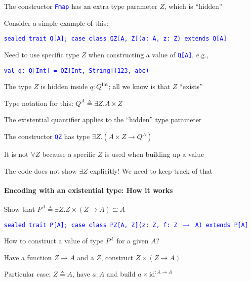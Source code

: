 The constructor \texttt{\textcolor{blue}{\footnotesize{}Fmap}} has
an extra type parameter $Z$, which is \textsf{``}hidden\textsf{''}

Consider a simple example of this:

\texttt{\textcolor{blue}{\footnotesize{}sealed trait Q{[}A{]}; case
class QZ{[}A, Z{]}(a: A, z: Z) extends Q{[}A{]}}}{\footnotesize\par}

Need to use specific type $Z$ when constructing a value of \texttt{\textcolor{blue}{\footnotesize{}Q{[}A{]}}},
e.g.,

\texttt{\textcolor{blue}{\footnotesize{}val q: Q{[}Int{]} = QZ{[}Int,
String{]}(123, \textquotedbl abc\textquotedbl )}}{\footnotesize\par}

The type $Z$ is hidden inside $q:Q^{\text{Int}}$; all we know is
that $Z$ \textsf{``}exists\textsf{''}

Type notation for this: $Q^{A}\triangleq\exists Z.A\times Z$

The existential quantifier applies to the \textsf{``}hidden\textsf{''} type parameter

The constructor \texttt{\textcolor{blue}{\footnotesize{}QZ}} has type
$\exists Z.\left(A\times Z\rightarrow Q^{A}\right)$

It is not $\forall Z$ because a specific $Z$ is used when building
up a value

The code does not show $\exists Z$ explicitly! We need to keep track
of that


\paragraph{Encoding with an existential type: How it works}

Show that $P^{A}\triangleq\exists Z.Z\times\left(Z\rightarrow A\right)\cong A$

\texttt{\textcolor{blue}{\footnotesize{}sealed trait P{[}A{]}; case
class PZ{[}A, Z{]}(z: Z, f: Z $\rightarrow$ A) extends P{[}A{]}}}{\footnotesize\par}

How to construct a value of type $P^{A}$ for a given $A$?

Have a function $Z\rightarrow A$ and a $Z$, construct $Z\times\left(Z\rightarrow A\right)$

Particular case: $Z\triangleq A$, have $a:A$ and build $a\times\text{id}^{:A\rightarrow A}$

